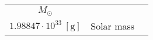 \begin{center}
\begin{tabularx}{\textwidth}{ccX}
$M_{\odot}$	&
	\begin{tabular}{c}
        $1.98847\cdot 10^{30}\ [\si{\kilogram}]$ \\
         $1.98847\cdot 10^{33}\ [\si{\gram}]$
	\end{tabular} 
	& Solar mass \\
	
\hline

\end{tabularx}

\endgroup

\end{center}
